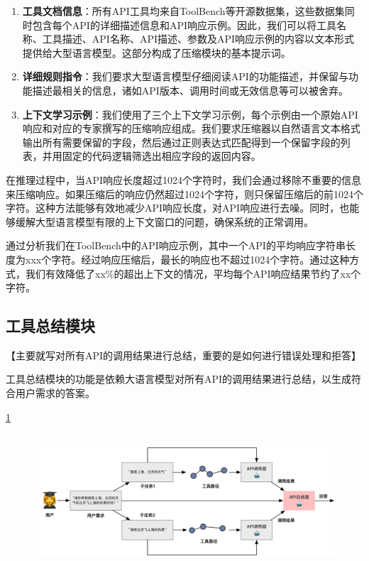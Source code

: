 \begin{enumerate}
    \item \textbf{工具文档信息}：所有API工具均来自ToolBench等开源数据集，这些数据集同时包含每个API的详细描述信息和API响应示例。因此，我们可以将工具名称、工具描述、API名称、API描述、参数及API响应示例的内容以文本形式提供给大型语言模型。这部分构成了压缩模块的基本提示词。
    
    \item \textbf{详细规则指令}：我们要求大型语言模型仔细阅读API的功能描述，并保留与功能描述最相关的信息，诸如API版本、调用时间或无效信息等可以被舍弃。
    
    \item \textbf{上下文学习示例}：我们使用了三个上下文学习示例，每个示例由一个原始API响应和对应的专家撰写的压缩响应组成。我们要求压缩器以自然语言文本格式输出所有需要保留的字段，然后通过正则表达式匹配得到一个保留字段的列表，并用固定的代码逻辑筛选出相应字段的返回内容。
\end{enumerate}

在推理过程中，当API响应长度超过1024个字符时，我们会通过移除不重要的信息来压缩响应。如果压缩后的响应仍然超过1024个字符，则只保留压缩后的前1024个字符。这种方法能够有效地减少API响应长度，对API响应进行去噪。同时，也能够缓解大型语言模型有限的上下文窗口的问题，确保系统的正常调用。

通过分析我们在ToolBench中的API响应示例，其中一个API的平均响应字符串长度为xxx个字符。经过响应压缩后，最长的响应也不超过1024个字符。通过这种方式，我们有效降低了xx\%的超出上下文的情况，平均每个API响应结果节约了xx个字符。

\subsection{工具总结模块}

【主要就写对所有API的调用结果进行总结，重要的是如何进行错误处理和拒答】

工具总结模块的功能是依赖大语言模型对所有API的调用结果进行总结，以生成符合用户需求的答案。

\ref{fig:ch4-summary}

\begin{figure}[!htp]
  \vspace{1em}
  \centering
  \setlength{\abovecaptionskip}{10pt} %
  \includegraphics[height=5cm]{../assets/ch4-工具总结模块.pdf}
  \label{fig:ch4-summary}
\end{figure}


